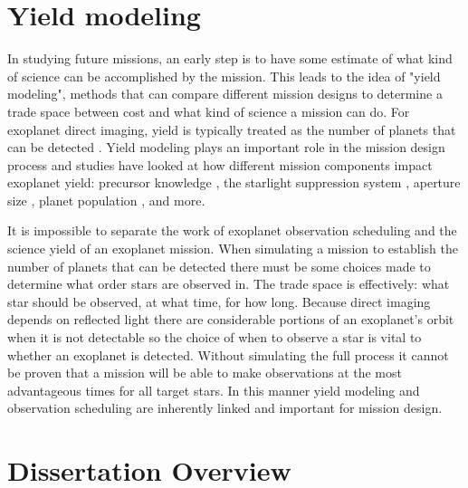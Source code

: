 \section{Yield modeling}
\label{sec:intro_yield_modeling}

In studying future missions, an early step is to have some estimate of what
kind of science can be accomplished by the mission. This leads to the idea of
"yield modeling", methods that can compare different mission designs to
determine a trade space between cost and what kind of science a mission can do.
For exoplanet direct imaging, yield is typically treated as the number of
planets that can be detected
\citep{brownSingleVisitPhotometric2005,savranskyAnalyzingDesignsPlanetFinding2010,
starkMaximizingExoEarthCandidate2014}. Yield modeling plays an important role
in the mission design process and studies have looked at how different
mission components impact exoplanet yield: precursor knowledge
\citep{morganFasterExoEarth2021}, the starlight suppression system
\citep{savranskyAnalyzingDesignsPlanetFinding2010,morgan19, Stark2016},
aperture size \citep{starkLowerLimitsAperture2015}, planet population
\citep{savranskyComparisonAnalyticalDepth2016}, and more. 

It is impossible to separate the work of exoplanet observation scheduling and
the science yield of an exoplanet mission. When simulating a mission to
establish the number of planets that can be detected there must be some choices
made to determine what order stars are observed in. The trade space is
effectively: what star should be observed, at what time, for how long. Because
direct imaging depends on reflected light there are considerable portions of an
exoplanet's orbit when it is not detectable so the choice of when to observe a
star is vital to whether an exoplanet is detected. Without simulating the full
process it cannot be proven that a mission will be able to make observations at
the most advantageous times for all target stars. In this manner yield modeling
and observation scheduling are inherently linked and important for mission
design.


\section{Dissertation Overview}
\label{sec:dis_overview}


